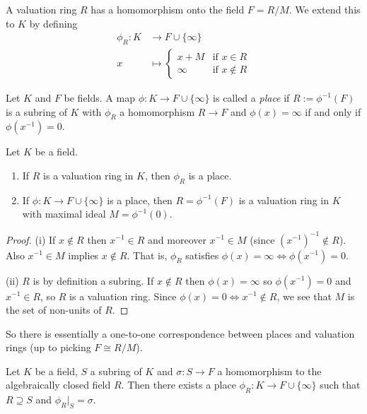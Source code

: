 A valuation ring $R$ has a homomorphism onto the field $F = R/M$.
We extend this to $K$ by defining
\begin{align*}
    \phi_R \colon K &\to F \cup \{\infty\} \\
                  x &\mapsto \begin{cases}
                      x + M  & \text{if } x \in R \\
                      \infty & \text{if } x \notin R
                  \end{cases}
\end{align*}

\begin{definition}
    Let $K$ and $F$ be fields.
    A map $\phi \colon K \to F \cup \{\infty\}$ is called a \emph{place} if $R := \phi^{-1}(F)$ is a subring of $K$ with $\phi_R$ a homomorphism $R \to F$ and $\phi(x) = \infty$ if and only if $\phi(x^{-1}) = 0$.
\end{definition}

\begin{lemma}
    Let $K$ be a field.
    \begin{enumerate}
        \item[(i)] If $R$ is a valuation ring in $K$, then $\phi_R$ is a place.
        \item[(ii)] If $\phi \colon K \to F \cup \{\infty\}$ is a place, then $R = \phi^{-1}(F)$ is a valuation ring in $K$ with maximal ideal $M = \phi^{-1}(0)$.
    \end{enumerate}
\end{lemma}

\begin{proof}
    (i) If $x \notin R$ then $x^{-1} \in R$ and moreover $x^{-1} \in M$ (since $(x^{-1})^{-1} \notin R$).
    Also $x^{-1} \in M$ implies $x \notin R$.
    That is, $\phi_R$ satisfies $\phi(x) = \infty \Leftrightarrow \phi(x^{-1}) = 0$.

    (ii) $R$ is by definition a subring.
    If $x \notin R$ then $\phi(x) = \infty$ so $\phi(x^{-1}) = 0$ and $x^{-1} \in R$, so $R$ is a valuation ring.
    Since $\phi(x) = 0 \Leftrightarrow x^{-1} \notin R$, we see that $M$ is the set of non-units of $R$.
\end{proof}

So there is essentially a one-to-one correspondence between places and valuation rings (up to picking $F \cong R / M$).

\begin{theorem}
    Let $K$ be a field, $S$ a subring of $K$ and $\sigma \colon S \to F$ a homomorphism to the algebraically closed field $R$.
    Then there exists a place $\phi_R \colon K \to F \cup \{\infty\}$ such that $R \supseteq S$ and $\phi_R|_S = \sigma$.
\end{theorem}

